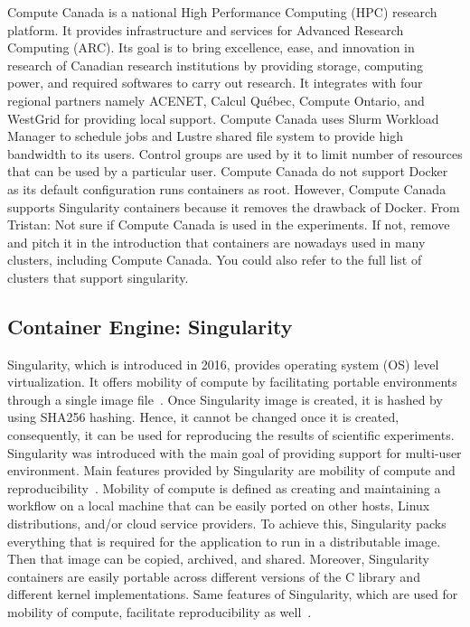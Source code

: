 \documentclass[a4paper,num-refs]{oup-contemporary}
\newcommand{\TG}[1]{\color{blue}From Tristan: #1\color{black}}
\begin{document}
Compute Canada is a national High Performance Computing (HPC) research platform.
It provides infrastructure and services for Advanced Research Computing (ARC).
Its goal is to bring excellence, ease, and innovation in research of Canadian
research institutions by providing storage, computing power, and required
softwares to carry out research.
It integrates with four regional partners namely ACENET, Calcul Québec, Compute
Ontario, and WestGrid for providing local support.
Compute Canada uses Slurm Workload Manager to schedule jobs and Lustre shared
file system to provide high bandwidth to its users.
Control groups are used by it to limit number of resources that can be used
by a particular user.
Compute Canada do not support Docker as its default configuration
runs containers as root. However, Compute Canada supports Singularity
containers because it removes the drawback of Docker.
\TG{Not sure if Compute Canada is used in the experiments. If not, remove and 
pitch it in the introduction that containers are nowadays used in many clusters, including 
Compute Canada. You could also refer to the full list of clusters that support singularity.}

\subsection{Container Engine: Singularity}

Singularity, which is introduced in 2016, provides operating system (OS) level
virtualization.
It offers mobility of compute by facilitating portable environments 
through a single image file~\cite{kurtzer2016singularity}. Once Singularity image
is created, it is hashed by using SHA256 hashing. Hence, it cannot be changed
once it is created, consequently, it can be used for reproducing the results of
scientific experiments. Singularity was introduced with the main goal of
providing support for multi-user environment. Main features provided by
Singularity are mobility of compute and reproducibility~\cite{kurtzer2017singularity}.
Mobility of compute is defined as creating and maintaining a workflow on
a local machine that can be easily ported on other hosts, Linux distributions,
and/or cloud service providers. To achieve this, Singularity packs everything
that is required for the application to run in a distributable image. Then that
image can be copied, archived, and shared. Moreover, Singularity containers
are easily portable across different versions of the C library and different kernel
implementations.
Same features of Singularity, which are used for mobility of compute,
facilitate reproducibility as well~\cite{sochat2017enhancing}.
\end{document}
